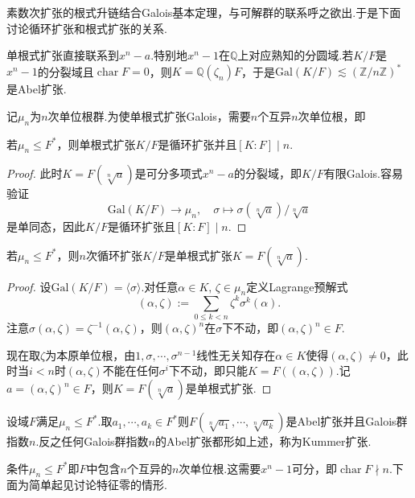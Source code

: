 素数次扩张的根式升链结合Galois基本定理，与可解群的联系呼之欲出.于是下面讨论循环扩张和根式扩张的关系.
\begin{remark}
    单根式扩张直接联系到$x^n-a$.特别地$x^n-1$在$\mathbb{Q}$上对应熟知的分圆域.若$K/F$是$x^n-1$的分裂域且$\operatorname*{char}F=0$，则$K=\mathbb{Q}(\zeta_n)F$，于是$\mathrm{Gal}(K/F)\lesssim(\mathbb{Z}/n\mathbb{Z})^*$是Abel扩张.
\end{remark}

记$\mu_n$为$n$次单位根群.为使单根式扩张Galois，需要$n$个互异$n$次单位根，即
\begin{prop}
    若$\mu_n\le F^*$，则单根式扩张$K/F$是循环扩张并且$[K:F]\mid n$.
\end{prop}
\begin{proof}
    此时$K=F(\sqrt[n]{a})$是可分多项式$x^n-a$的分裂域，即$K/F$有限Galois.容易验证
    \[
        \mathrm{Gal}(K/F)\to\mu_n,\quad\sigma\mapsto\sigma(\sqrt[n]{a})/\sqrt[n]{a}
    \]
    是单同态，因此$K/F$是循环扩张且$[K:F]\mid n$.
\end{proof}
\begin{prop}
    若$\mu_n\le F^*$，则$n$次循环扩张$K/F$是单根式扩张$K=F(\sqrt[n]{a})$.
\end{prop}
\begin{proof}
    设$\mathrm{Gal}(K/F)=\langle \sigma\rangle $.对任意$\alpha\in K,\,\zeta\in\mu_n$定义{\heiti Lagrange预解式}
    \[
        (\alpha,\zeta):=\sum_{0\le k<n}\zeta^k\sigma^k(\alpha).
    \]
    注意$\sigma(\alpha,\zeta)=\zeta^{-1}(\alpha,\zeta)$，则$(\alpha,\zeta)^n$在$\sigma$下不动，即$(\alpha,\zeta)^n\in F$.

    现在取$\zeta$为本原单位根，由$1,\sigma,\cdots,\sigma^{n-1}$线性无关知存在$\alpha\in K$使得$(\alpha,\zeta)\ne 0$，此时当$i<n$时$(\alpha,\zeta)$不能在任何$\sigma^i$下不动，即只能$K=F((\alpha,\zeta))$.记$a=(\alpha,\zeta)^n\in F$，则$K=F(\sqrt[n]{a})$是单根式扩张.
\end{proof}
\begin{remark}
    设域$F$满足$\mu_n\le F^*$.取$a_1,\cdots,a_k\in F^*$则$F(\sqrt[n]{a_1},\cdots,\sqrt[n]{a_k})$是Abel扩张并且Galois群指数$n$.反之任何Galois群指数$n$的Abel扩张都形如上述，称为{\heiti Kummer扩张}.
\end{remark}

条件$\mu_n\le F^*$即$F$中包含$n$个互异的$n$次单位根.这需要$x^n-1$可分，即$\operatorname*{char}F\nmid n$.下面为简单起见讨论特征零的情形.

